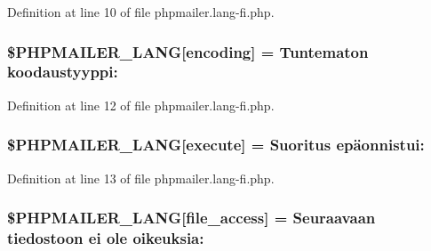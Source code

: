 Definition at line 10 of file phpmailer.\+lang-\/fi.\+php.

\subsubsection[{\texorpdfstring{\$\+P\+H\+P\+M\+A\+I\+L\+E\+R\+\_\+\+L\+A\+NG}{$PHPMAILER_LANG}}]{\setlength{\rightskip}{0pt plus 5cm}\$P\+H\+P\+M\+A\+I\+L\+E\+R\+\_\+\+L\+A\+NG\mbox{[}\textquotesingle{}encoding\textquotesingle{}\mbox{]} = \textquotesingle{}Tuntematon koodaustyyppi\+: \textquotesingle{}}\hypertarget{phpmailer_8lang-fi_8php_a817f7283f3d54c970a0c10305cc668cc}{}\label{phpmailer_8lang-fi_8php_a817f7283f3d54c970a0c10305cc668cc}


Definition at line 12 of file phpmailer.\+lang-\/fi.\+php.

\subsubsection[{\texorpdfstring{\$\+P\+H\+P\+M\+A\+I\+L\+E\+R\+\_\+\+L\+A\+NG}{$PHPMAILER_LANG}}]{\setlength{\rightskip}{0pt plus 5cm}\$P\+H\+P\+M\+A\+I\+L\+E\+R\+\_\+\+L\+A\+NG\mbox{[}\textquotesingle{}execute\textquotesingle{}\mbox{]} = \textquotesingle{}Suoritus epäonnistui\+: \textquotesingle{}}\hypertarget{phpmailer_8lang-fi_8php_a668217a9563a168f30f2a8548b6ed5a9}{}\label{phpmailer_8lang-fi_8php_a668217a9563a168f30f2a8548b6ed5a9}


Definition at line 13 of file phpmailer.\+lang-\/fi.\+php.

\subsubsection[{\texorpdfstring{\$\+P\+H\+P\+M\+A\+I\+L\+E\+R\+\_\+\+L\+A\+NG}{$PHPMAILER_LANG}}]{\setlength{\rightskip}{0pt plus 5cm}\$P\+H\+P\+M\+A\+I\+L\+E\+R\+\_\+\+L\+A\+NG\mbox{[}\textquotesingle{}file\+\_\+access\textquotesingle{}\mbox{]} = \textquotesingle{}Seuraavaan tiedostoon ei ole oikeuksia\+: \textquotesingle{}}\hypertarget{phpmailer_8lang-fi_8php_a7e83349023b856ef9e5c46e30ae6d51e}{}\label{phpmailer_8lang-fi_8php_a7e83349023b856ef9e5c46e30ae6d51e}


